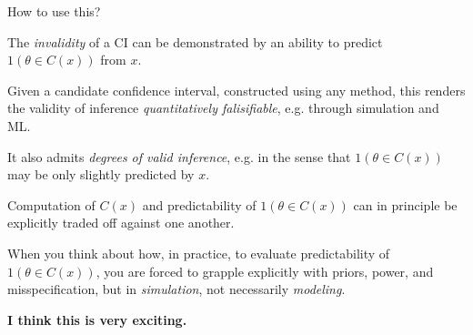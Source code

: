 \documentclass[8pt]{beamer}\usepackage[]{graphicx}\usepackage[]{color}
\begin{document}

\begin{frame}{How to use this?}

The {\em invalidity} of a CI can be demonstrated by an ability
to predict $1(\theta \in C(x))$ from $x$.

\pause

Given a candidate confidence interval, constructed using any method, this
renders the validity of inference {\em quantitatively falisifiable}, e.g.
through simulation and ML.

\pause

It also admits {\em degrees of valid inference}, e.g. in the sense that
$1(\theta \in C(x))$ may be only slightly
predicted by $x$.

\pause

Computation of $C(x)$ and predictability of $1(\theta \in C(x))$
can in principle be explicitly traded off against one another.

\pause

When you think about how, in practice, to evaluate predictability of
$1(\theta \in C(x))$, you are forced to grapple explicitly with priors,
power, and misspecification, but in {\em simulation}, not necessarily
{\em modeling}.

\pause

\textbf{I think this is very exciting.}

\end{frame}
\end{document}
